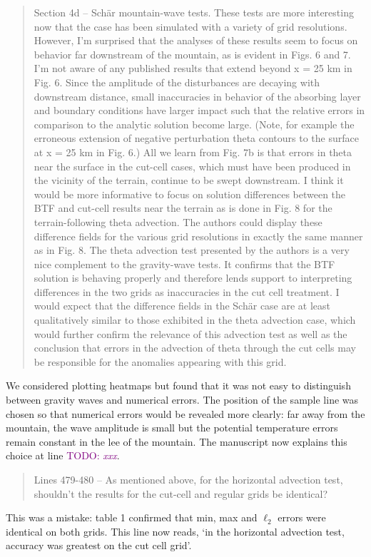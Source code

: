 \documentclass{article}
\newcommand{\TODO}[1]{\textcolor{purple}{TODO: \emph{#1}}}
\begin{document}
\begin{quotation}
	Section 4d – Sch\"{a}r mountain-wave tests. These tests are more interesting now that 
 the case has been simulated with a variety of grid resolutions. However, I'm 
 surprised that the analyses of these results seem to focus on behavior far 
 downstream of the mountain, as is evident in Figs. 6 and 7. I'm not aware of any 
 published results that extend beyond x = 25 km in Fig. 6. Since the amplitude of the 
 disturbances are decaying with downstream distance, small inaccuracies in behavior 
 of the absorbing layer and boundary conditions have larger impact such that the 
 relative errors in comparison to the analytic solution become large. (Note, for 
 example the erroneous extension of negative perturbation theta contours to the 
 surface at x = 25 km in Fig. 6.)  All we learn from Fig. 7b is that errors in theta near 
 the surface in the cut-cell cases, which must have been produced in the vicinity of the 
 terrain, continue to be swept downstream. I think it would be more informative to 
 focus on solution differences between the BTF and cut-cell results near the terrain as 
 is done in Fig. 8 for the terrain-following theta advection. The authors could display 
 these difference fields for the various grid resolutions in exactly the same manner as 
 in Fig. 8. The theta advection test presented by the authors is a very nice complement 
 to the gravity-wave tests. It confirms that the BTF solution is behaving properly and 
 therefore lends support to interpreting differences in the two grids as inaccuracies in 
 the cut cell treatment. I would expect that the difference fields in the Sch\"{a}r case are 
 at least qualitatively similar to those exhibited in the theta advection case, which 
 would further confirm the relevance of this advection test as well as the conclusion 
 that errors in the advection of theta through the cut cells may be responsible for the 
 anomalies appearing with this grid.
\end{quotation}
We considered plotting heatmaps but found that it was not easy to distinguish between gravity waves and numerical errors.  The position of the sample line was chosen so that numerical errors would be revealed more clearly: far away from the mountain, the wave amplitude is small but the potential temperature errors remain constant in the lee of the mountain.  The manuscript now explains this choice at line \TODO{xxx}.

\begin{quotation}
 Lines 479-480 – As mentioned above, for the horizontal advection test, shouldn't the  results for the cut-cell and regular grids be identical?
\end{quotation}
This was a mistake: table 1 confirmed that min, max and $\ell_2$ errors were identical on both grids.  This line now reads, `in the horizontal advection test, accuracy was greatest on the cut cell grid'.
\end{document}
